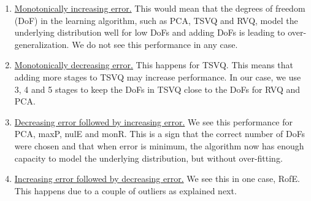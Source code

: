 \begin{enumerate}
\item \underline{Monotonically increasing error.}  This would mean that the degrees of freedom (DoF) in the learning algorithm, such as PCA, TSVQ and RVQ, model the underlying distribution well for low DoFs and adding DoFs is leading to over-generalization.  We do not see this performance in any case.
\item \underline{Monotonically decreasing error.}  This happens for TSVQ.  This means that adding more stages to TSVQ may increase performance.  In our case, we use 3, 4 and 5 stages to keep the DoFs in TSVQ close to the DoFs for RVQ and PCA.
\item \underline{Decreasing error followed by increasing error.}  We see this performance for PCA, maxP, nulE and monR.  This is a sign that the correct number of DoFs were chosen and that when error is minimum, the algorithm now has enough capacity to model the underlying distribution, but without over-fitting.
\item \underline{Increasing error followed by decreasing error.}  We see this in one case, RofE.  This happens due to a couple of outliers as explained next.

\end{enumerate}

%



